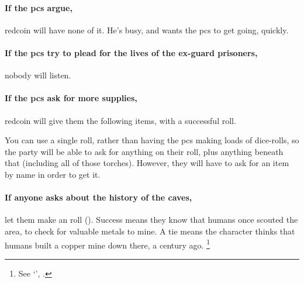 \begin{multicols}{2}

\paragraph{If the \glspl{pc} argue,}
\gls{redcoin} will have none of it.
He's busy, and wants the \glspl{pc} to get going, quickly.

\paragraph{If the \glspl{pc} try to plead for the lives of the ex-\gls{guard} prisoners,}
nobody will listen.


\paragraph{If the \glspl{pc} ask for more supplies,}
\gls{redcoin} will give them the following items, with a successful  roll.

You can use a single roll, rather than having the \glspl{pc} making loads of dice-rolls, so the party will be able to ask for anything on their roll, plus anything beneath that  (including all of those torches).
However, they will have to ask for an item by name in order to get it.

\paragraph{If anyone asks about the history of the caves,}
let them make an  roll (\tn[12]).
Success means they know that humans once scouted the area, to check for valuable metals to mine.
A tie means the character thinks that humans built a copper mine down there, a century ago.%
\footnote{See `', .}


\end{multicols}

